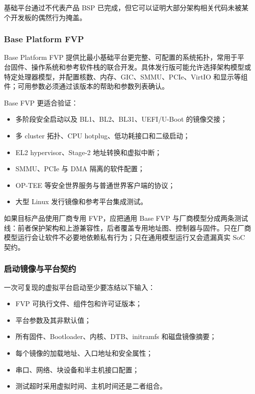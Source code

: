 基础平台通过不代表产品 BSP 已完成，但它可以证明大部分架构相关代码未被某个开发板的偶然行为掩盖。

\subsubsection{Base Platform FVP}

Base Platform FVP 提供比最小基础平台更完整、可配置的系统拓扑，常用于平台固件、操作系统和参考软件栈的联合开发。具体发行版可能允许选择架构模型或特定处理器模型，并配置核数、内存、GIC、SMMU、PCIe、VirtIO 和显示等组件；可用参数必须通过该版本的帮助和参数列表确认。

Base FVP 更适合验证：

\begin{itemize}
  \item 多阶段安全启动以及 BL1、BL2、BL31、UEFI/U-Boot 的镜像交接；
  \item 多 cluster 拓扑、CPU hotplug、低功耗接口和二级启动；
  \item EL2 hypervisor、Stage-2 地址转换和虚拟中断；
  \item SMMU、PCIe 与 DMA 隔离的软件配置；
  \item OP-TEE 等安全世界服务与普通世界客户端的协议；
  \item 大型 Linux 发行镜像和参考平台集成测试。
\end{itemize}

如果目标产品使用厂商专用 FVP，应把通用 Base FVP 与厂商模型分成两条测试线：前者保护架构和上游兼容性，后者覆盖专用地址图、控制器与固件。只在厂商模型运行会让软件不必要地依赖私有行为；只在通用模型运行又会遗漏真实 SoC 契约。

\subsubsection{启动镜像与平台契约}

一次可复现的虚拟平台启动至少要冻结以下输入：

\begin{itemize}
  \item FVP 可执行文件、组件包和许可证版本；
  \item 平台参数及其非默认值；
  \item 所有固件、Bootloader、内核、DTB、initramfs 和磁盘镜像摘要；
  \item 每个镜像的加载地址、入口地址和安全属性；
  \item 串口、网络、块设备和半主机接口配置；
  \item 测试超时采用虚拟时间、主机时间还是二者组合。
\end{itemize}

